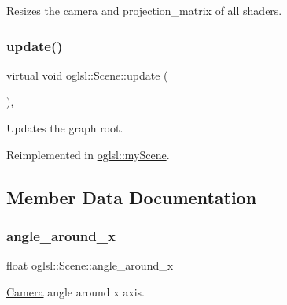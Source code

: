 Resizes the camera and projection\+\_\+matrix of all shaders. 

\mbox{\label{classoglsl_1_1_scene_accbf0c6f23ccd909f63851c0bc547449}} 
\subsubsection{\texorpdfstring{update()}{update()}}
{\footnotesize\ttfamily virtual void oglsl\+::\+Scene\+::update (\begin{DoxyParamCaption}{ }\end{DoxyParamCaption})\hspace{0.3cm}{\ttfamily [inline]}, {\ttfamily [virtual]}}



Updates the graph root. 



Reimplemented in \mbox{\hyperlink{classoglsl_1_1my_scene_a798dcfe11aee5c093013c59b665b6754}{oglsl\+::my\+Scene}}.



\subsection{Member Data Documentation}
\mbox{\label{classoglsl_1_1_scene_a3acba5c9ee3e2712b142550f5f06c488}} 
\subsubsection{\texorpdfstring{angle\+\_\+around\+\_\+x}{angle\_around\_x}}
{\footnotesize\ttfamily float oglsl\+::\+Scene\+::angle\+\_\+around\+\_\+x\hspace{0.3cm}{\ttfamily [protected]}}



\mbox{\hyperlink{classoglsl_1_1_camera}{Camera}} angle around x axis. 

\mbox{\label{classoglsl_1_1_scene_af8751fb0147fb71a1f4d5a0ddf94b99e}} 
